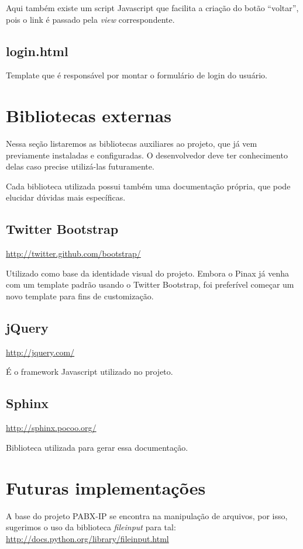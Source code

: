 \documentclass[letterpaper,10pt,brazil]{sphinxmanual}
\begin{document}
Aqui também existe um script Javascript que facilita a criação do botão ``voltar'', pois o link é passado pela \emph{view} correspondente.


\subsection{login.html}
\label{templates:login-html}
Template que é responsável por montar o formulário de login do usuário.


\section{Bibliotecas externas}
\label{bibliotecas:bibliotecas-externas}\label{bibliotecas::doc}
Nessa seção listaremos as bibliotecas auxiliares ao projeto, que já vem previamente instaladas e configuradas. O desenvolvedor deve ter conhecimento delas caso precise utilizá-las futuramente.

Cada biblioteca utilizada possui também uma documentação própria, que pode elucidar dúvidas mais específicas.


\subsection{Twitter Bootstrap}
\label{bibliotecas:twitter-bootstrap}
\href{http://twitter.github.com/bootstrap/}{http://twitter.github.com/bootstrap/}

Utilizado como base da identidade visual do projeto. Embora o Pinax já venha com um template padrão usando o Twitter Bootstrap, foi preferível começar um novo template para fins de customização.


\subsection{jQuery}
\label{bibliotecas:jquery}
\href{http://jquery.com/}{http://jquery.com/}

É o framework Javascript utilizado no projeto.


\subsection{Sphinx}
\label{bibliotecas:sphinx}
\href{http://sphinx.pocoo.org/}{http://sphinx.pocoo.org/}

Biblioteca utilizada para gerar essa documentação.


\section{Futuras implementações}
\label{futuro::doc}\label{futuro:futuras-implementacoes}
A base do projeto PABX-IP se encontra na manipulação de arquivos, por isso, sugerimos o uso da biblioteca \emph{fileinput} para tal:  \href{http://docs.python.org/library/fileinput.html}{http://docs.python.org/library/fileinput.html}
\end{document}
